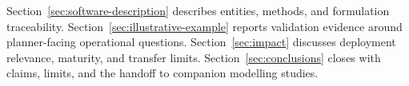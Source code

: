 Section~\ref{sec:software-description} describes entities, methods, and formulation traceability. Section~\ref{sec:illustrative-example} reports validation evidence around planner-facing operational questions. Section~\ref{sec:impact} discusses deployment relevance, maturity, and transfer limits. Section~\ref{sec:conclusions} closes with claims, limits, and the handoff to companion modelling studies.
